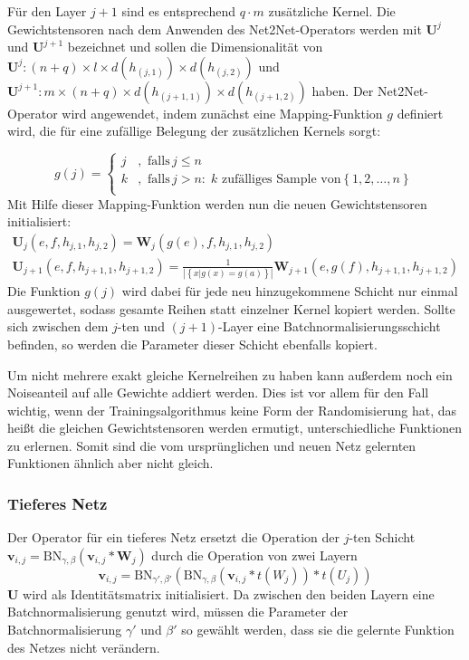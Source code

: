 Für den Layer $j+1$ sind es entsprechend $q \cdot m $ zusätzliche Kernel. Die Gewichtstensoren nach dem Anwenden des Net2Net-Operators werden mit $\mathbf{U}^j$ und $\mathbf{U}^{j+1}$ bezeichnet und sollen die Dimensionalität von $\mathbf{U}^j: (n+q) \times l \times d(h_{(j,1)}) \times d(h_{(j,2)})$ und $\mathbf{U}^{j+1}: m \times (n+q) \times d(h_{(j+1,1)}) \times d(h_{(j+1,2)})$ haben. Der Net2Net-Operator wird angewendet, indem zunächst eine Mapping-Funktion $g$ definiert wird, die für eine zufällige Belegung der zusätzlichen Kernels sorgt:

\begin{equation}
 g(j) =  
 \begin{cases}
 j & , \text{ falls} \, j \leq n \\
 k & , \text{ falls} \, j>n : \;  k \text{ zufälliges Sample von} \left\{ 1,2,\ldots, n \right\} \\ 
 \end{cases} 
 \end{equation}
 Mit Hilfe dieser Mapping-Funktion werden nun die neuen Gewichtstensoren initialisiert:
 \begin{align*}
 \mathbf{U}_j(e,f,h_{j,1},h_{j,2}) = \mathbf{W}_j(g(e),f,h_{j,1},h_{j,2}) \\
 \mathbf{U}_{j+1}(e,f,h_{j+1,1},h_{j+1,2})= \frac{1}{|\left\{ x | g(x)=g(a)\right\}|}\mathbf{W}_{j+1}(e,g(f),h_{j+1,1},h_{j+1,2})
 \end{align*}
Die Funktion $g(j)$ wird dabei für jede neu hinzugekommene Schicht nur einmal ausgewertet, sodass gesamte Reihen statt einzelner Kernel kopiert werden. Sollte sich zwischen dem $j$-ten und $(j+1)$-Layer eine Batchnormalisierungsschicht befinden, so werden die Parameter dieser Schicht ebenfalls kopiert.

Um nicht mehrere exakt gleiche Kernelreihen zu haben kann außerdem noch ein Noiseanteil auf alle Gewichte addiert werden. Dies ist vor allem für den Fall wichtig, wenn der Trainingsalgorithmus keine Form der Randomisierung hat, das heißt die gleichen Gewichtstensoren werden ermutigt, unterschiedliche Funktionen zu erlernen. Somit sind die vom ursprünglichen und neuen Netz gelernten Funktionen ähnlich aber nicht gleich.

\subsubsection{Tieferes Netz}

Der Operator für ein tieferes Netz ersetzt die Operation der $j$-ten Schicht $\mathbf{v}_{i,j} = \text{BN}_{\gamma,\beta}( \mathbf{v}_{i,j}* \mathbf{W}_{j})$ durch die Operation von zwei Layern  
\begin{equation}
\mathbf{v}_{i,j} =\text{BN}_{\gamma',\beta'}( \text{BN}_{\gamma,\beta}( \mathbf{v}_{i,j} * t(W_{j})) * t(U_{j})    )
\end{equation}
$\mathbf{U}$ wird als Identitätsmatrix initialisiert.
Da zwischen den beiden Layern eine Batchnormalisierung genutzt wird, müssen die Parameter der Batchnormalisierung $\gamma'$ und $\beta'$ so gewählt werden, dass sie die gelernte Funktion des Netzes nicht verändern.


